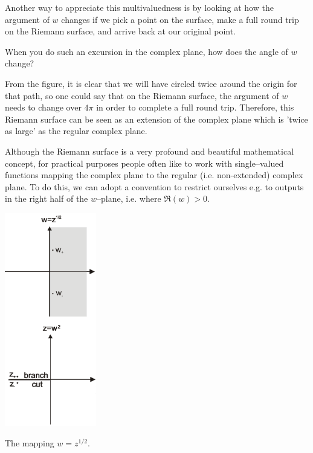 Another way to appreciate this multivaluedness is by looking at how the argument of $w$ changes if we pick a point on the surface, make a full round trip on the Riemann surface, and arrive back at our original point.

\begin{cue}
When you do such an excursion in the complex plane, how does the angle of $w$ change? 
\end{cue}

From the figure, it is clear that we will have circled twice around the origin for that path, so one could say that on the Riemann surface, the argument of $w$ needs to change over $4 \pi$ in order to complete a full round trip. Therefore, this Riemann surface can be seen as an extension of the complex plane which is 'twice as large' as the regular complex plane.

\pagebreak


Although the Riemann surface is a very profound and beautiful mathematical concept, for practical purposes people often like to work with single--valued functions mapping the complex plane to the regular (i.e. non-extended) complex plane. To do this, we can adopt a convention to restrict ourselves e.g. to outputs in the right half of the $w$--plane, i.e. where $\Re(w)>0$.


\begin{marginfigure}[-1cm]
\centering
\includegraphics[width=4cm]{complex/figures/branchcut_portrait}
\caption{The mapping $w=z^{1/2}$.}
\label{fig-branchcut}
\end{marginfigure}


